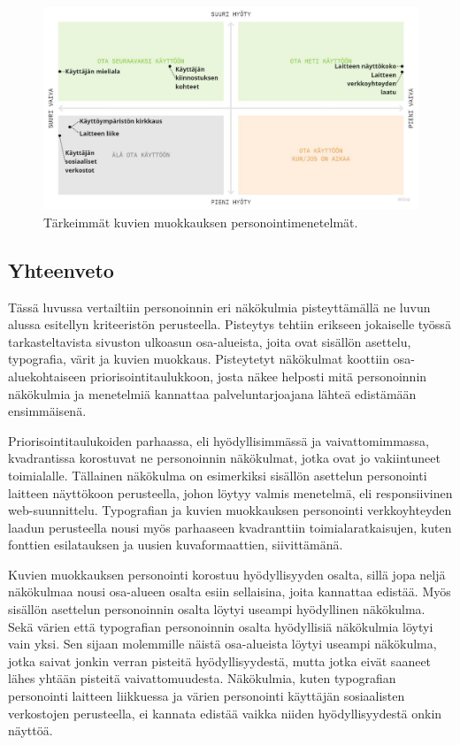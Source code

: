 \documentclass[finnish, 12pt, a4paper, elec, utf8, a-1b, online]{aaltothesis}
\begin{document}
\begin{figure}[h]
    \centering
    \includegraphics[width=\textwidth]{images/images-priorization.pdf}
    \caption{Tärkeimmät kuvien muokkauksen personointimenetelmät.~\label{fig:images-priorization}}
\end{figure}

\subsection{Yhteenveto}

Tässä luvussa vertailtiin personoinnin eri näkökulmia pisteyttämällä ne luvun
alussa esitellyn kriteeristön perusteella. Pisteytys tehtiin erikseen jokaiselle
työssä tarkasteltavista sivuston ulkoasun osa-alueista, joita ovat sisällön
asettelu, typografia, värit ja kuvien muokkaus. Pisteytetyt näkökulmat koottiin
osa-aluekohtaiseen priorisointitaulukkoon, josta näkee helposti mitä
personoinnin näkökulmia ja menetelmiä kannattaa palveluntarjoajana lähteä
edistämään ensimmäisenä.

Priorisointitaulukoiden parhaassa, eli hyödyllisimmässä ja vaivattomimmassa,
kvadrantissa korostuvat ne personoinnin näkökulmat, jotka ovat jo vakiintuneet
toimialalle. Tällainen näkökulma on esimerkiksi sisällön asettelun personointi
laitteen näyttökoon perusteella, johon löytyy valmis menetelmä, eli
responsiivinen web-suunnittelu. Typografian ja kuvien muokkauksen personointi
verkkoyhteyden laadun perusteella nousi myös parhaaseen kvadranttiin
toimialaratkaisujen, kuten fonttien esilatauksen ja uusien kuvaformaattien,
siivittämänä.

Kuvien muokkauksen personointi korostuu hyödyllisyyden osalta, sillä jopa neljä
näkökulmaa nousi osa-alueen osalta esiin sellaisina, joita kannattaa edistää.
Myös sisällön asettelun personoinnin osalta löytyi useampi hyödyllinen
näkökulma. Sekä värien että typografian personoinnin osalta hyödyllisiä
näkökulmia löytyi vain yksi. Sen sijaan molemmille näistä osa-alueista löytyi
useampi näkökulma, jotka saivat jonkin verran pisteitä hyödyllisyydestä, mutta
jotka eivät saaneet lähes yhtään pisteitä vaivattomuudesta. Näkökulmia, kuten
typografian personointi laitteen liikkuessa ja värien personointi käyttäjän
sosiaalisten verkostojen perusteella, ei kannata edistää vaikka niiden
hyödyllisyydestä onkin näyttöä.
\end{document}
